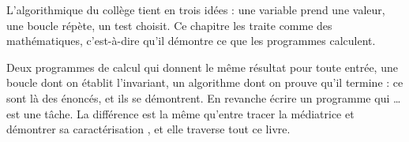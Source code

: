 L'algorithmique du collège tient en trois idées : une variable prend une valeur, une boucle
répète, un test choisit. Ce chapitre les traite comme des mathématiques, c'est-à-dire qu'il
démontre ce que les programmes calculent.

Deux programmes de calcul qui donnent le même résultat pour toute entrée, une boucle dont on
établit l'invariant, un algorithme dont on prouve qu'il termine : ce sont là des énoncés, et
ils se démontrent. En revanche \og{} écrire un programme qui \dots{} \fg{} est une tâche.
La différence est la même qu'entre \og{} tracer la médiatrice \fg{} et \og{} démontrer sa
caractérisation \fg{}, et elle traverse tout ce livre.
